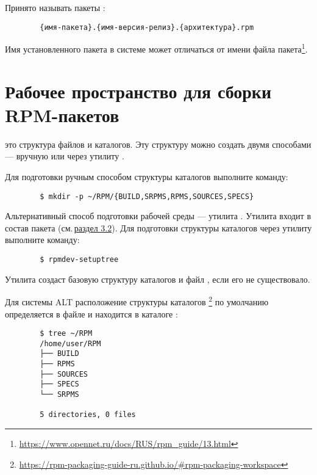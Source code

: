 Принято называть пакеты :
\begin{verbatim}
        {имя-пакета}.{имя-версия-релиз}.{архитектура}.rpm
\end{verbatim}


Имя установленного пакета в системе может отличаться от имени файла пакета\footnote{\href{https://www.opennet.ru/docs/RUS/rpm_guide/13.html}{https://www.opennet.ru/docs/RUS/rpm\_guide/13.html}}.

\hypertarget{3.4}{\section{Рабочее пространство для сборки RPM-пакетов}}
 это структура файлов и каталогов. Эту структуру
можно создать двумя способами --- вручную или через утилиту .

Для подготовки ручным способом структуры каталогов выполните команду:
\begin{verbatim}
        $ mkdir -p ~/RPM/{BUILD,SRPMS,RPMS,SOURCES,SPECS}
\end{verbatim}

Альтернативный способ подготовки рабочей среды --- утилита . Утилита входит в
состав пакета  (см.\,\hyperlink{3.2}{раздел 3.2}). Для подготовки структуры каталогов
через утилиту  выполните команду:
\begin{verbatim}
        $ rpmdev-setuptree
\end{verbatim}

Утилита создаст базовую структуру каталогов и файл , если его не существовало.

Для системы ALT расположение структуры каталогов%
\footnote{\href{https://rpm-packaging-guide-ru.github.io/\#rpm-packaging-workspace}{https://rpm-packaging-guide-ru.github.io/\#rpm-packaging-workspace}}
 по умолчанию определяется в файле  и находится в каталоге :
\begin{verbatim}
        $ tree ~/RPM
        /home/user/RPM
        ├── BUILD
        ├── RPMS
        ├── SOURCES
        ├── SPECS
        └── SRPMS

        5 directories, 0 files
\end{verbatim}

